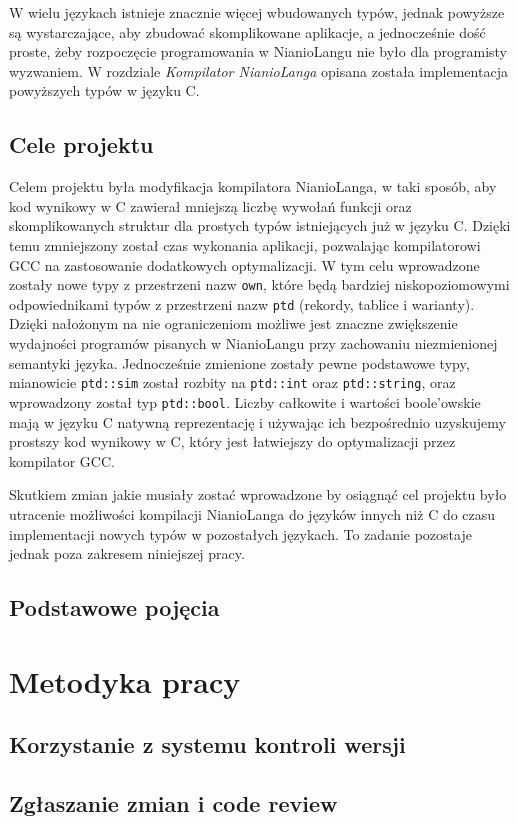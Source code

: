 \documentclass[licencjacka]{pracamgr}
\begin{document}
W wielu językach istnieje znacznie więcej wbudowanych typów, jednak powyższe są wystarczające, aby zbudować skomplikowane aplikacje,
a jednocześnie dość proste, żeby rozpoczęcie programowania w NianioLangu nie było dla programisty wyzwaniem.
W rozdziale \textit{Kompilator NianioLanga} opisana została implementacja powyższych typów w języku C.

\section{Cele projektu}
Celem projektu była modyfikacja kompilatora NianioLanga, w taki sposób, aby kod wynikowy w C zawierał mniejszą liczbę wywołań funkcji oraz skomplikowanych
struktur dla prostych typów istniejących już w języku C.
Dzięki temu zmniejszony został czas wykonania aplikacji, pozwalając kompilatorowi GCC na zastosowanie dodatkowych optymalizacji.
W tym celu wprowadzone zostały nowe typy z przestrzeni nazw \texttt{own},
które będą bardziej niskopoziomowymi odpowiednikami typów z przestrzeni nazw \texttt{ptd} (rekordy, tablice i warianty).
Dzięki nałożonym na nie ograniczeniom możliwe jest znaczne zwiększenie wydajności programów pisanych w NianioLangu przy zachowaniu
niezmienionej semantyki języka.
Jednocześnie zmienione zostały pewne podstawowe typy, mianowicie \texttt{ptd::sim} został rozbity na
\texttt{ptd::int} oraz \texttt{ptd::string}, oraz wprowadzony został typ \texttt{ptd::bool}.
Liczby całkowite i wartości boole'owskie mają w języku C natywną reprezentację i używając ich bezpośrednio
uzyskujemy prostszy kod wynikowy w C, który jest łatwiejszy do optymalizacji przez kompilator GCC.

Skutkiem zmian jakie musiały zostać wprowadzone by osiągnąć cel projektu było utracenie możliwości
kompilacji NianioLanga do języków innych niż C do czasu implementacji nowych typów w pozostałych językach.
To zadanie pozostaje jednak poza zakresem niniejszej pracy.
\section{Podstawowe pojęcia}
\chapter{Metodyka pracy}
\section{Korzystanie z systemu kontroli wersji}
\section{Zgłaszanie zmian i code review}
\end{document}
